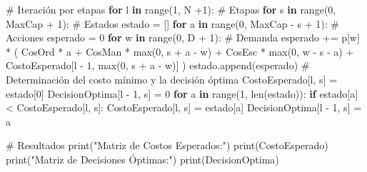 \documentclass[
  us-letterpaper,
  DIV=11,
  numbers=noendperiod]{scrreprt}
\newenvironment{Shaded}{\begin{snugshade}}{\end{snugshade}}
\newcommand{\BuiltInTok}[1]{\textcolor[rgb]{0.00,0.23,0.31}{#1}}
\newcommand{\CommentTok}[1]{\textcolor[rgb]{0.37,0.37,0.37}{#1}}
\newcommand{\ControlFlowTok}[1]{\textcolor[rgb]{0.00,0.23,0.31}{\textbf{#1}}}
\newcommand{\DecValTok}[1]{\textcolor[rgb]{0.68,0.00,0.00}{#1}}
\newcommand{\KeywordTok}[1]{\textcolor[rgb]{0.00,0.23,0.31}{\textbf{#1}}}
\newcommand{\NormalTok}[1]{\textcolor[rgb]{0.00,0.23,0.31}{#1}}
\newcommand{\OperatorTok}[1]{\textcolor[rgb]{0.37,0.37,0.37}{#1}}
\newcommand{\StringTok}[1]{\textcolor[rgb]{0.13,0.47,0.30}{#1}}
\begin{document}
\begin{Shaded}
\begin{Highlighting}[]
\CommentTok{\# Iteración por etapas}
\ControlFlowTok{for}\NormalTok{ l }\KeywordTok{in} \BuiltInTok{range}\NormalTok{(}\DecValTok{1}\NormalTok{, N }\OperatorTok{+}\DecValTok{1}\NormalTok{):  }\CommentTok{\# Etapas}
    \ControlFlowTok{for}\NormalTok{ s }\KeywordTok{in} \BuiltInTok{range}\NormalTok{(}\DecValTok{0}\NormalTok{, MaxCap }\OperatorTok{+} \DecValTok{1}\NormalTok{):  }\CommentTok{\# Estados}
\NormalTok{        estado }\OperatorTok{=}\NormalTok{ []}
        \ControlFlowTok{for}\NormalTok{ a }\KeywordTok{in} \BuiltInTok{range}\NormalTok{(}\DecValTok{0}\NormalTok{, MaxCap }\OperatorTok{{-}}\NormalTok{ s }\OperatorTok{+} \DecValTok{1}\NormalTok{):  }\CommentTok{\# Acciones}
\NormalTok{            esperado }\OperatorTok{=} \DecValTok{0}
            \ControlFlowTok{for}\NormalTok{ w }\KeywordTok{in} \BuiltInTok{range}\NormalTok{(}\DecValTok{0}\NormalTok{, D }\OperatorTok{+} \DecValTok{1}\NormalTok{):  }\CommentTok{\# Demanda}
\NormalTok{                esperado }\OperatorTok{+=}\NormalTok{ p[w] }\OperatorTok{*}\NormalTok{ (}
\NormalTok{                    CosOrd }\OperatorTok{*}\NormalTok{ a}
                    \OperatorTok{+}\NormalTok{ CosMan }\OperatorTok{*} \BuiltInTok{max}\NormalTok{(}\DecValTok{0}\NormalTok{, s }\OperatorTok{+}\NormalTok{ a }\OperatorTok{{-}}\NormalTok{ w)}
                    \OperatorTok{+}\NormalTok{ CosEsc }\OperatorTok{*} \BuiltInTok{max}\NormalTok{(}\DecValTok{0}\NormalTok{, w }\OperatorTok{{-}}\NormalTok{ s }\OperatorTok{{-}}\NormalTok{ a)}
                    \OperatorTok{+}\NormalTok{ CostoEsperado[l }\OperatorTok{{-}} \DecValTok{1}\NormalTok{, }\BuiltInTok{max}\NormalTok{(}\DecValTok{0}\NormalTok{, s }\OperatorTok{+}\NormalTok{ a }\OperatorTok{{-}}\NormalTok{ w)]}
\NormalTok{                )}
\NormalTok{            estado.append(esperado)}
        \CommentTok{\# Determinación del costo mínimo y la decisión óptima}
\NormalTok{        CostoEsperado[l, s] }\OperatorTok{=}\NormalTok{ estado[}\DecValTok{0}\NormalTok{]}
\NormalTok{        DecisionOptima[l }\OperatorTok{{-}} \DecValTok{1}\NormalTok{, s] }\OperatorTok{=} \DecValTok{0}
        \ControlFlowTok{for}\NormalTok{ a }\KeywordTok{in} \BuiltInTok{range}\NormalTok{(}\DecValTok{1}\NormalTok{, }\BuiltInTok{len}\NormalTok{(estado)):}
            \ControlFlowTok{if}\NormalTok{ estado[a] }\OperatorTok{\textless{}}\NormalTok{ CostoEsperado[l, s]:}
\NormalTok{                CostoEsperado[l, s] }\OperatorTok{=}\NormalTok{ estado[a]}
\NormalTok{                DecisionOptima[l }\OperatorTok{{-}} \DecValTok{1}\NormalTok{, s] }\OperatorTok{=}\NormalTok{ a}

\CommentTok{\# Resultados}
\BuiltInTok{print}\NormalTok{(}\StringTok{"Matriz de Costos Esperados:"}\NormalTok{)}
\BuiltInTok{print}\NormalTok{(CostoEsperado)}
\BuiltInTok{print}\NormalTok{(}\StringTok{"Matriz de Decisiones Óptimas:"}\NormalTok{)}
\BuiltInTok{print}\NormalTok{(DecisionOptima)}
\end{Highlighting}
\end{Shaded}
\end{document}
